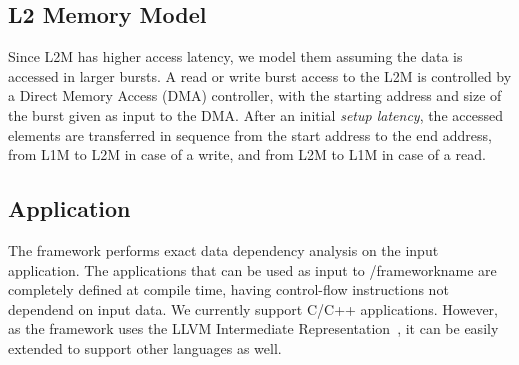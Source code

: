 
\vspace{-1mm}
\subsection{L2 Memory Model}
\label{ssec:layer2_model}
\vspace{-1mm}
Since L2M has higher access latency, we model them assuming the data is accessed in larger bursts.
A read or write burst access to the L2M is controlled by a Direct Memory Access (DMA) controller, with the starting address and size of the burst given as input to the DMA. After an initial \textit{setup latency}, the accessed elements are transferred in sequence from the start address to the end address, from L1M to L2M in case of a write, and from L2M to L1M in case of a read.

\vspace{-1mm}
\subsection{Application}
\label{ssec:app}
\vspace{-1mm}
The framework performs exact data dependency analysis on the input application. The applications that can be used as input to /frameworkname are completely defined at compile time, having control-flow instructions not dependend on input data. We currently support C/C++ applications. However, as the framework uses the LLVM Intermediate Representation~\cite{llvm}, it can be easily extended to support other languages as well.

\vspace{-1mm}
